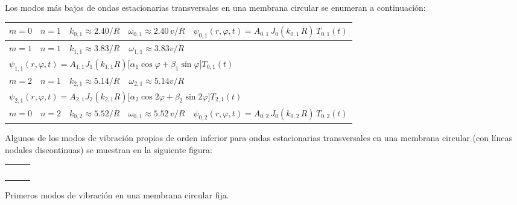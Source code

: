 Los modos más bajos de ondas estacionarias transversales en una membrana circular se enumeran a continuación:
\begin{table}[H]
\centering
\begin{tabular}{c c c c l}
$m {=} 0$ & $n {=} 1$ & $k_{0,1} {\approx} 2.40/R$ & $\omega_{0,1} {\approx} 2.40 \, v/R$ & $\psi_{0,1}(r, \varphi, t) {=} A_{0,1} \, J_{0}(k_{0,1} \, R) \, T_{0,1}(t)$ \\[0.5em] \hline
$m {=} 1$ & $n {=} 1$ & $k_{1,1} {\approx} 3.83/R$ & $\omega_{1,1} {\approx} 3.83 v/R$ & \\[0.5em]
\multicolumn{5}{l}{$\psi_{1,1}(r, \varphi, t) {=} A_{1,1} J_{1}(k_{1,1} R) \big[ \alpha_{1} \cos \varphi {+} \beta_{1} \sin \varphi \big] T_{0,1}(t)$} \\[0.5em] \hline
$m {=} 2$ & $n {=} 1$ & $k_{2,1} {\approx} 5.14/R$ & $\omega_{2,1} {\approx} 5.14 v/R$ & \\[0.5em]
\multicolumn{5}{l}{$\psi_{2,1}(r, \varphi, t) {=} A_{2,1} J_{2}(k_{2,1} R) \big[ \alpha_{2} \cos 2 \varphi {+} \beta_{2} \sin 2 \varphi \big] T_{2,1}(t)$} \\[0.5em] \hline
$m {=} 0$ & $n {=} 2$ & $k_{0,2} {\approx} 5.52/R$ & $\omega_{0,1} {\approx} 5.52 \, v/R$ & $\psi_{0,2}(r, \varphi, t) {=} A_{0,2} \, J_{0}(k_{0,2} \, R) \, T_{0,2}(t)$
\end{tabular}
\end{table}
Algunos de los modos de vibración propios de orden inferior para ondas estacionarias transversales en una membrana circular (con líneas nodales discontinuas) se muestran en la siguiente figura:
\begin{table}[H]
\centering
\begin{tabular}{c@{\hskip 0.5cm} c@{\hskip 0.5cm} c@{\hskip 0.5cm}}
 &  & 
 \\
\multicolumn{3}{c}{} \\
 &  & 
 \\
\multicolumn{3}{c}{} \\
 &  & 

\end{tabular}
Primeros modos de vibración en una membrana circular fija.
\end{table}

